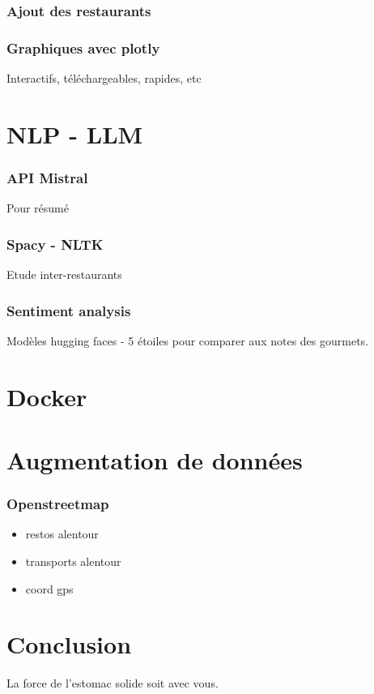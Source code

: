 \documentclass[10pt,french]{report}
\begin{document}
	\subsection{Ajout des restaurants}
	
	\subsection{Graphiques avec plotly}
	
	Interactifs, téléchargeables, rapides, etc
	
	\chapter{NLP - LLM}
	
	\subsection{API Mistral}
	
	Pour résumé
	
	\subsection{Spacy - NLTK}
	
	Etude inter-restaurants
	
	\subsection{Sentiment analysis}
	
	Modèles hugging faces - 5 étoiles pour comparer aux notes des gourmets.
	
	\chapter{Docker}
	
	\chapter{Augmentation de données}
	
	\subsection{Openstreetmap}
	
	\begin{itemize}
		\item restos alentour
		\item transports alentour
		\item coord gps
	\end{itemize}
	
	\chapter{Conclusion}
	
	La force de l'estomac solide soit avec vous.
	
	
\end{document}
